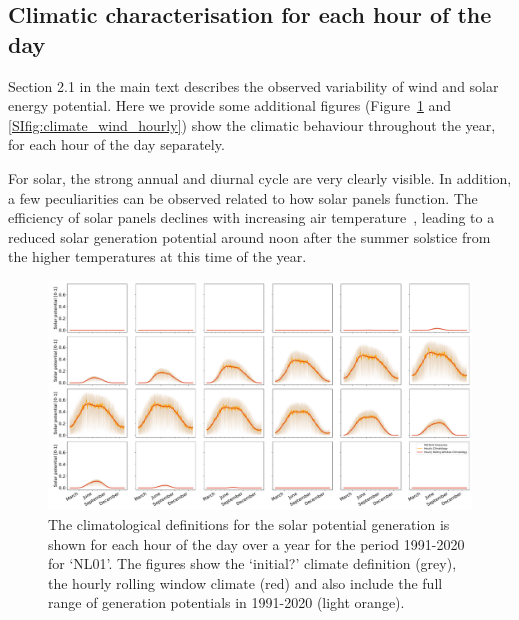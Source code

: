 \documentclass[12pt]{iopart}
\begin{document}
\subsection{Climatic characterisation for each hour of the day }\label{app:clima_hourly}
Section 2.1 in the main text describes the observed variability of wind and solar energy potential. 
Here we provide some additional figures (Figure~\ref{SIfig:climate_solar_hourly} and \ref{SIfig:climate_wind_hourly}) show the climatic behaviour throughout the year, for each hour of the day separately. 

For solar, the strong annual and diurnal cycle are very clearly visible. 
In addition, a few peculiarities can be observed related to how solar panels function. 
The efficiency of solar panels declines with increasing air temperature~\parencite{SaintDrenan2018}, leading to a reduced solar generation potential around noon after the summer solstice from the higher temperatures at this time of the year.  
\begin{figure}[b]
    \centering
    \includegraphics[width=\textwidth]{Figures_SI/climatology_solar_hourly.pdf}
    \caption{
    The climatological definitions for the solar potential generation is shown for each hour of the day over a year for the period 1991-2020 for `NL01'. 
    The figures show the `initial?' climate definition (grey), the hourly rolling window climate (red) and also include the full range of generation potentials in 1991-2020 (light orange). }
    \label{SIfig:climate_solar_hourly}
\end{figure}
\end{document}
